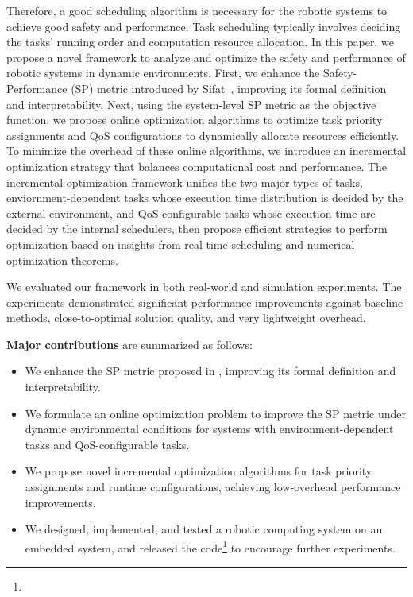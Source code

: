     Therefore, a good scheduling algorithm is necessary for the robotic systems to achieve good
    safety and performance. Task scheduling typically involves deciding the tasks' running order and
    computation resource allocation.
    In this paper, we propose a novel framework to analyze and optimize the safety and performance of
    robotic systems in dynamic environments. First, we enhance the Safety-Performance (SP) metric
    introduced by Sifat~\cite{Ash23RAL}, improving its formal definition and interpretability. Next,
    using the system-level SP metric as the objective function, 
	we propose online optimization algorithms to optimize task priority assignments and QoS
    configurations to dynamically allocate resources efficiently.
    To minimize the overhead of these online algorithms, we introduce an incremental optimization
    strategy that balances computational cost and performance. 
	The incremental optimization framework unifies the two major types of tasks, enviornment-dependent tasks 
	whose execution time distribution is decided by the external environment, and QoS-configurable tasks whose execution time
	are decided by the internal schedulers, then propose efficient strategies to perform optimization based on
	insights from real-time scheduling and numerical optimization theorems.

    We evaluated our framework in both real-world and simulation experiments. 
	The experiments demonstrated significant performance improvements against baseline methods,
	close-to-optimal solution quality, and very lightweight overhead.


	\textbf{Major contributions} are summarized as follows:
	\begin{itemize}
		\item We enhance the SP metric proposed in \cite{Ash23RAL}, improving its formal definition
        and interpretability.
        \item We formulate an online optimization problem to improve the SP metric under dynamic
        environmental conditions for systems with environment-dependent tasks and QoS-configurable tasks.
        \item We propose novel incremental optimization algorithms for task priority assignments and
        runtime configurations, achieving low-overhead performance improvements.
        \item We designed, implemented, and tested a robotic computing system on an embedded system,
        and released the code\footnote{\githubLink{}} to encourage further experiments.
	\end{itemize}


